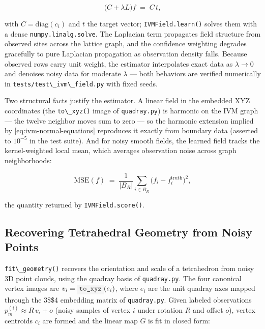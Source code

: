 \documentclass[
  10pt,
]{article}
\newcommand{\passthrough}[1]{#1}
\renewcommand{\texttt}[1]{%
    \colorbox{codebg}{\color{codefg}\ttfamily #1}%
}
\begin{document}
\begin{equation}
\label{eq:ivm-normal-equations}
\bigl( C + \lambda L \bigr) f \;=\; C\, t ,
\end{equation}

with \(C = \mathrm{diag}(c_i)\) and \(t\) the target vector;
\passthrough{\lstinline!IVMField.learn()!} solves them with a dense
\passthrough{\lstinline!numpy.linalg.solve!}. The Laplacian term
propagates field structure from observed sites across the lattice graph,
and the confidence weighting degrades gracefully to pure Laplacian
propagation as observation density falls. Because observed rows carry
unit weight, the estimator interpolates exact data as \(\lambda \to 0\)
and denoises noisy data for moderate \(\lambda\) --- both behaviors are
verified numerically in
\passthrough{\lstinline!tests/test\_ivm\_field.py!} with fixed seeds.

Two structural facts justify the estimator. A linear field in the
embedded XYZ coordinates (the \passthrough{\lstinline!to\_xyz()!} image
of \passthrough{\lstinline!quadray.py!}) is harmonic on the IVM graph
--- the twelve neighbor moves sum to zero --- so the harmonic extension
implied by \eqref{eq:ivm-normal-equations} reproduces it exactly from
boundary data (asserted to \(10^{-5}\) in the test suite). And for noisy
smooth fields, the learned field tracks the kernel-weighted local mean,
which averages observation noise across graph neighborhoods:

\begin{equation}
\label{eq:ivm-mse}
\mathrm{MSE}(f) \;=\; \frac{1}{|B_R|} \sum_{i \in B_R} \bigl( f_i - f_i^{\text{truth}} \bigr)^2 ,
\end{equation}

the quantity returned by \passthrough{\lstinline!IVMField.score()!}.

\subsection{Recovering Tetrahedral Geometry from Noisy
Points}\label{recovering-tetrahedral-geometry-from-noisy-points}

\passthrough{\lstinline!fit\_geometry()!} recovers the orientation and
scale of a tetrahedron from noisy 3D point clouds, using the quadray
basis of \passthrough{\lstinline!quadray.py!}. The four canonical vertex
images are \(v_i = \texttt{to\_xyz}(e_i)\), where \(e_i\) are the unit
quadray axes mapped through the 3\$\times\$4 embedding matrix of
\passthrough{\lstinline!quadray.py!}. Given labeled observations
\(p^{(i)}_m \approx R\, v_i + o\) (noisy samples of vertex \(i\) under
rotation \(R\) and offset \(o\)), vertex centroids \(c_i\) are formed
and the linear map \(G\) is fit in closed form:
\end{document}
